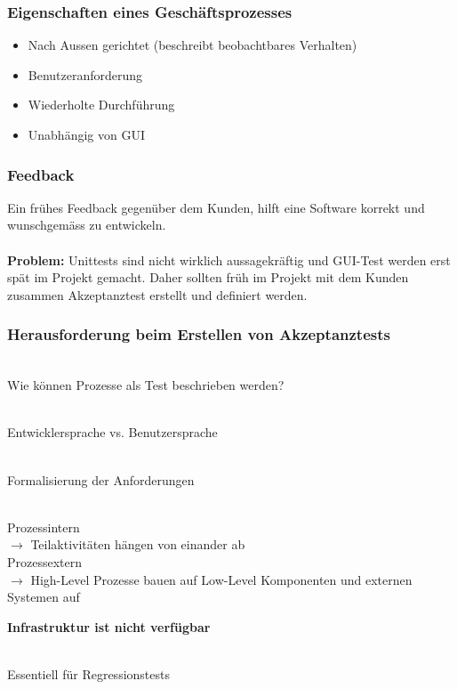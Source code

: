\documentclass[a4paper,10pt]{article}
\newcommand{\Bold}[1]{\textbf{#1}} %
\begin{document}
\subsubsection{Eigenschaften eines Gesch\"aftsprozesses}
\begin{itemize}
\item Nach Aussen gerichtet (beschreibt beobachtbares Verhalten)
\item Benutzeranforderung
\item Wiederholte Durchf\"uhrung
\item Unabh\"angig von GUI
\end{itemize}

\subsubsection{Feedback}
Ein fr\"uhes Feedback gegen\"uber dem Kunden, hilft eine Software korrekt und wunschgem\"ass zu entwickeln.\\\\
\textbf{\Bold Problem:} Unittests sind nicht wirklich aussagekr\"aftig und GUI-Test werden erst sp\"at im Projekt gemacht. Daher sollten fr\"uh im Projekt mit dem Kunden zusammen Akzeptanztest erstellt und definiert werden.

\subsubsection{Herausforderung beim Erstellen von Akzeptanztests}
\begin{description}
\item[\Bold {Prozesse}] \hfill \\ 
	Wie k\"onnen Prozesse als Test beschrieben werden?
\item[\Bold {Die Sprache}] \hfill \\
	Entwicklersprache vs. Benutzersprache
\item[\Bold{Komplexit\"at}] \hfill \\
	Formalisierung der Anforderungen
\item[\Bold{Abh\"angigkeiten}] \hfill \\
	Prozessintern\\
	$\rightarrow$ Teilaktivit\"aten h\"angen von einander ab\\
	Prozessextern\\
	$\rightarrow$ High-Level Prozesse bauen auf Low-Level Komponenten und externen Systemen auf
\item \Bold {Infrastruktur ist nicht verf\"ugbar}
\item[\Bold {Automatisierung}] \hfill \\ 
	Essentiell f\"ur Regressionstests
\end{description}
\end{document}
